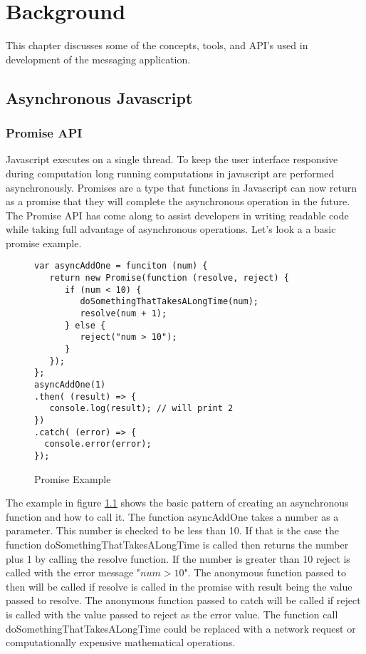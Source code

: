 \chapter{Background}


This chapter discusses some of the concepts, tools, and API’s used in development of the messaging application.


\section{Asynchronous Javascript}


\subsection{Promise API}


Javascript executes on a single thread. To keep the user interface responsive during computation long running computations in javascript are performed asynchronously. Promises are a type that functions in Javascript can now return as a promise that they will complete the asynchronous operation in the future. The Promise API has come along to assist developers in writing readable code while taking full advantage of asynchronous operations. Let’s look a a basic promise example.


\begin{figure}[!htbp]
\centering
\begin{lstlisting}[basicstyle=\small]
var asyncAddOne = funciton (num) {
   return new Promise(function (resolve, reject) {
      if (num < 10) {
         doSomethingThatTakesALongTime(num);
         resolve(num + 1);
      } else {
         reject("num > 10");
      }  
   }); 
}; 
asyncAddOne(1)
.then( (result) => {
   console.log(result); // will print 2
})
.catch( (error) => {
  console.error(error);
});
\end{lstlisting}
\caption{Promise Example}
\label{fig:promise}
\end{figure}


The example in figure \ref{fig:promise} shows the basic pattern of creating an asynchronous function and how to call it. The function asyncAddOne takes a number as a parameter. This number is checked to be less than 10. If that is the case the function doSomethingThatTakesALongTime is called then returns the number plus 1 by calling the resolve function. If the number is greater than 10 reject is called with the error message "$num > 10$". The anonymous function passed to then will be called if resolve is called in the promise with result being the value passed to resolve. The anonymous function passed to catch will be called if reject is called with the value passed to reject as the error value. The function call doSomethingThatTakesALongTime could be replaced with a network request or computationally expensive mathematical operations.


